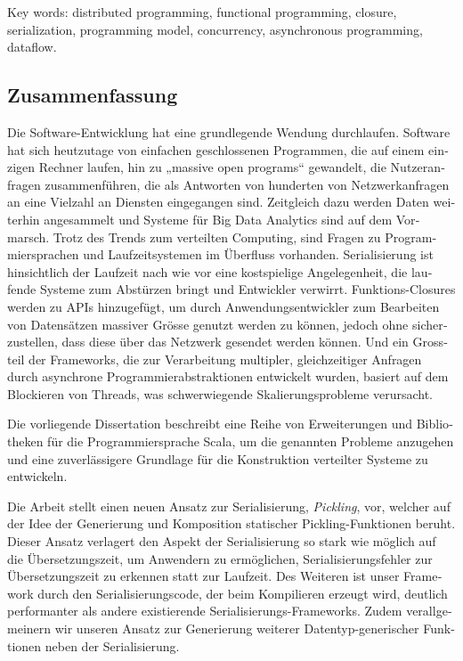 \vskip0.5cm
Key words: distributed programming, functional programming, closure, serialization, programming model, concurrency, asynchronous programming, dataflow.


\begin{otherlanguage}{german}
\cleardoublepage
\chapter*{Zusammenfassung}

Die Software-Entwicklung hat eine grundlegende Wendung durchlaufen. Software hat
sich heutzutage von einfachen geschlossenen Programmen, die auf einem einzigen
Rechner laufen, hin zu „massive open programs“ gewandelt, die Nutzeranfragen
zusammenführen, die als Antworten von hunderten von Netzwerkanfragen an eine
Vielzahl an Diensten eingegangen sind. Zeitgleich dazu werden Daten weiterhin
angesammelt und Systeme für Big Data Analytics sind auf dem Vormarsch. Trotz des
Trends zum verteilten Computing, sind Fragen zu Programmiersprachen und
Laufzeitsystemen im Überfluss vorhanden. Serialisierung ist hinsichtlich der
Laufzeit nach wie vor eine kostspielige Angelegenheit, die laufende Systeme zum
Abstürzen bringt und Entwickler verwirrt. Funktions-Closures werden zu APIs
hinzugefügt, um durch Anwendungsentwickler zum Bearbeiten von Datensätzen
massiver Grösse genutzt werden zu können, jedoch ohne sicherzustellen, dass
diese über das Netzwerk gesendet werden können. Und ein Grossteil der
Frameworks, die zur Verarbeitung multipler, gleichzeitiger Anfragen durch
asynchrone Programmierabstraktionen entwickelt wurden, basiert auf dem
Blockieren von Threads, was schwerwiegende Skalierungsprobleme verursacht.

\vspace{0.2cm}

Die vorliegende Dissertation beschreibt eine Reihe von Erweiterungen und
Bibliotheken für die Programmiersprache Scala, um die genannten Probleme
anzugehen und eine zuverlässigere Grundlage für die Konstruktion verteilter
Systeme zu entwickeln.

\vspace{0.2cm}

Die Arbeit stellt einen neuen Ansatz zur Serialisierung, {\em Pickling}, vor,
welcher auf der Idee der Generierung und Komposition statischer
Pickling-Funktionen beruht. Dieser Ansatz verlagert den Aspekt der
Serialisierung so stark wie möglich auf die Übersetzungszeit, um Anwendern zu
ermöglichen, Serialisierungsfehler zur Übersetzungszeit zu erkennen statt zur
Laufzeit. Des Weiteren ist unser Framework durch den Serialisierungscode, der
beim Kompilieren erzeugt wird, deutlich performanter als andere existierende
Serialisierungs-Frameworks. Zudem verallgemeinern wir unseren Ansatz zur
Generierung weiterer Datentyp-generischer Funktionen neben der Serialisierung.


\end{otherlanguage}
